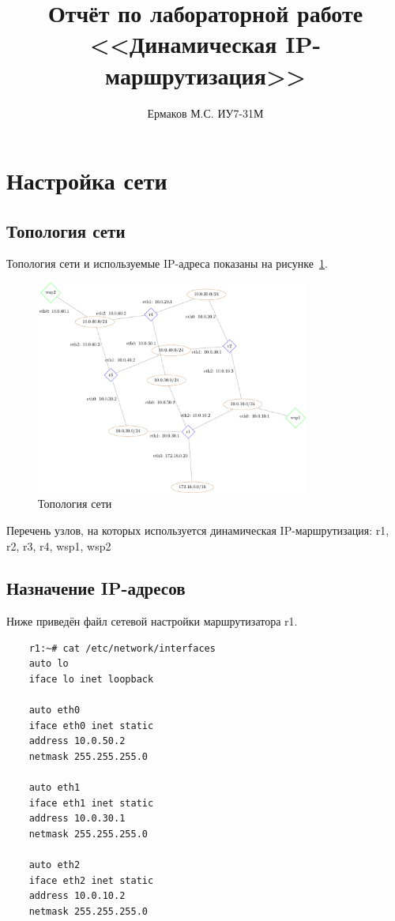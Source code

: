 \documentclass[a4paper,12pt]{article}
\title{Отчёт по лабораторной работе \\ <<Динамическая IP-маршрутизация>>}
\author{Ермаков М.С. ИУ7-31М}
\begin{document}
\maketitle

\tableofcontents

\section{Настройка сети}

\subsection{Топология сети}

Топология сети и используемые IP-адреса показаны на рисунке~\ref{fig:network}.

\begin{figure}
\centering
\includegraphics[width=0.8\textwidth]{includes/network_gv.pdf}
\caption{Топология сети}
\label{fig:network}
\end{figure}

Перечень узлов, на которых используется динамическая IP-маршрутизация:
r1, r2, r3, r4, wsp1, wsp2


\subsection{Назначение IP-адресов}

Ниже приведён файл сетевой настройки  маршрутизатора r1.

\begin{Verbatim}
    r1:~# cat /etc/network/interfaces 
    auto lo
    iface lo inet loopback
    
    auto eth0
    iface eth0 inet static
    address 10.0.50.2
    netmask 255.255.255.0
    
    auto eth1
    iface eth1 inet static
    address 10.0.30.1
    netmask 255.255.255.0
    
    auto eth2
    iface eth2 inet static
    address 10.0.10.2
    netmask 255.255.255.0
    
\end{Verbatim}
\end{document}
